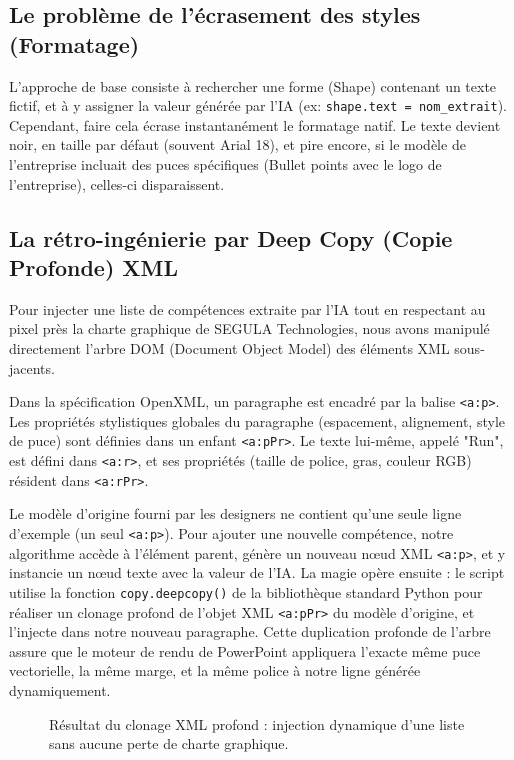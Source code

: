 \subsection{Le problème de l'écrasement des styles (Formatage)}
L'approche de base consiste à rechercher une forme (Shape) contenant un texte fictif, et à y assigner la valeur générée par l'IA (ex: \texttt{shape.text = nom\_extrait}). 
Cependant, faire cela écrase instantanément le formatage natif. Le texte devient noir, en taille par défaut (souvent Arial 18), et pire encore, si le modèle de l'entreprise incluait des puces spécifiques (Bullet points avec le logo de l'entreprise), celles-ci disparaissent. 

\subsection{La rétro-ingénierie par Deep Copy (Copie Profonde) XML}
Pour injecter une liste de compétences extraite par l'IA tout en respectant au pixel près la charte graphique de SEGULA Technologies, nous avons manipulé directement l'arbre DOM (Document Object Model) des éléments XML sous-jacents.

Dans la spécification OpenXML, un paragraphe est encadré par la balise \texttt{<a:p>}. Les propriétés stylistiques globales du paragraphe (espacement, alignement, style de puce) sont définies dans un enfant \texttt{<a:pPr>}. Le texte lui-même, appelé "Run", est défini dans \texttt{<a:r>}, et ses propriétés (taille de police, gras, couleur RGB) résident dans \texttt{<a:rPr>}.

Le modèle d'origine fourni par les designers ne contient qu'une seule ligne d'exemple (un seul \texttt{<a:p>}). Pour ajouter une nouvelle compétence, notre algorithme accède à l'élément parent, génère un nouveau nœud XML \texttt{<a:p>}, et y instancie un nœud texte avec la valeur de l'IA. La magie opère ensuite : le script utilise la fonction \texttt{copy.deepcopy()} de la bibliothèque standard Python pour réaliser un clonage profond de l'objet XML \texttt{<a:pPr>} du modèle d'origine, et l'injecte dans notre nouveau paragraphe. 
Cette duplication profonde de l'arbre assure que le moteur de rendu de PowerPoint appliquera l'exacte même puce vectorielle, la même marge, et la même police à notre ligne générée dynamiquement.

\begin{figure}[H]
    \centering
    \vspace{7cm} %
    \caption{Résultat du clonage XML profond : injection dynamique d'une liste sans aucune perte de charte graphique.}
    \label{fig:xml_deep_copy}
\end{figure}

